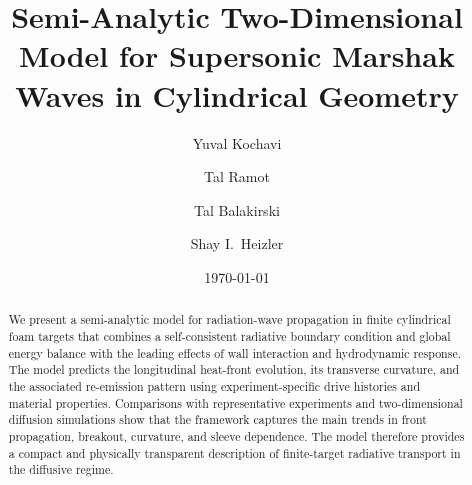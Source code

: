 \documentclass[prl, twocolumn, superscriptaddress, amsmath, amssymb, reprint]{revtex4-2}
\begin{document}
\title{Semi-Analytic Two-Dimensional Model for Supersonic Marshak Waves in Cylindrical Geometry}

\author{Yuval Kochavi}

\author{Tal Ramot}

\author{Tal Balakirski}

\author{Shay I.~Heizler}

\date{\today}

\begin{abstract}
We present a semi-analytic model for radiation-wave propagation in finite cylindrical foam targets that combines a self-consistent radiative boundary condition and global energy balance with the leading effects of wall interaction and hydrodynamic response. The model predicts the longitudinal heat-front evolution, its transverse curvature, and the associated re-emission pattern using experiment-specific drive histories and material properties. Comparisons with representative experiments and two-dimensional diffusion simulations show that the framework captures the main trends in front propagation, breakout, curvature, and sleeve dependence. The model therefore provides a compact and physically transparent description of finite-target radiative transport in the diffusive regime.
\end{abstract}

\maketitle
\end{document}
